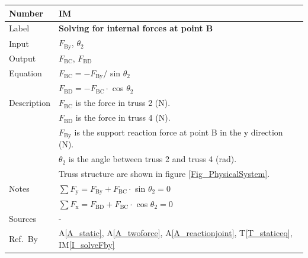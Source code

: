 \documentclass[12pt]{article}
\newcommand{\colAwidth}{0.13\textwidth}
\newcommand{\colBwidth}{0.82\textwidth}
\newcommand{\tref}[1]{T\ref{#1}}
\newcommand{\aref}[1]{A\ref{#1}}
\newcounter{instnum} %
\newcommand{\iref}[1]{IM\ref{#1}}
\begin{document}
\noindent
\begin{minipage}{\textwidth}
	\renewcommand*{\arraystretch}{1.5}
	\begin{tabular}{| p{\colAwidth} | p{\colBwidth}|}
		\hline
		\rowcolor[gray]{0.9}
		Number& IM{instnum}\theinstnum \label{I_solveB}\\
		\hline
		Label& \bf Solving for internal forces at point B\\
		\hline
		Input& $F_{\text{By}}$, $\theta_2$\\
		\hline
		Output& $F_{\text{{BC}}}$, $F_{\text{{BD}}}$\\
		\hline
		Equation& $F_{\text{{BC}}} = -F_{\text{By}} /$ sin $\theta_2$ \\
		&$F_{\text{{BD}}} = -F_{\text{{BC}}} \cdot$ cos $\theta_2$ \\
		\hline
		Description&$F_{\text{{BC}}}$ is the force in truss 2 (N).\\
		&$F_{\text{{BD}}}$ is the force in truss 4 (N).\\
		&$F_{\text{By}}$ is the support reaction force at point B in the y 
		direction (N).\\	
		&$\theta_2$ is the angle between truss 2 and truss 4 (\si{\radian}).\\
		&Truss structure are shown in figure \ref{Fig_PhysicalSystem}.\\
		\hline
		Notes& $\sum F_{\text{y}} = F_{\text{By}} + F_{\text{{BC}}} \cdot$ sin 
		$\theta_2 = 0$\\
		&$\sum F_{\text{x}} = F_{\text{BD}} + F_{\text{{BC}}} \cdot$ cos 
		$\theta_2 = 0$\\
		\hline
		Sources& - \\
		\hline
		Ref.\ By & \aref{A_static}, \aref{A_twoforce}, \aref{A_reactionjoint}, 
		\tref{T_staticeq}, \iref{I_solveFby}\\
		\hline
	\end{tabular}
\end{minipage}\\

~\newline
\end{document}
